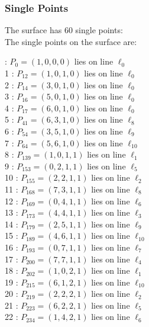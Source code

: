 \documentclass{article}
\begin{document}
{\subsubsection*{Single Points}
The surface has 60 single points:\\
The single points on the surface are:\\
\begin{multicols}{2}
 : $P_{0}=( 1, 0, 0, 0 )$ lies on line $\ell_{0}$\\
1 : $P_{12}=( 1, 0, 1, 0 )$ lies on line $\ell_{0}$\\
2 : $P_{14}=( 3, 0, 1, 0 )$ lies on line $\ell_{0}$\\
3 : $P_{16}=( 5, 0, 1, 0 )$ lies on line $\ell_{0}$\\
4 : $P_{17}=( 6, 0, 1, 0 )$ lies on line $\ell_{0}$\\
5 : $P_{41}=( 6, 3, 1, 0 )$ lies on line $\ell_{8}$\\
6 : $P_{54}=( 3, 5, 1, 0 )$ lies on line $\ell_{9}$\\
7 : $P_{64}=( 5, 6, 1, 0 )$ lies on line $\ell_{10}$\\
8 : $P_{139}=( 1, 0, 1, 1 )$ lies on line $\ell_{1}$\\
9 : $P_{153}=( 0, 2, 1, 1 )$ lies on line $\ell_{5}$\\
10 : $P_{155}=( 2, 2, 1, 1 )$ lies on line $\ell_{2}$\\
11 : $P_{168}=( 7, 3, 1, 1 )$ lies on line $\ell_{8}$\\
12 : $P_{169}=( 0, 4, 1, 1 )$ lies on line $\ell_{6}$\\
13 : $P_{173}=( 4, 4, 1, 1 )$ lies on line $\ell_{3}$\\
14 : $P_{179}=( 2, 5, 1, 1 )$ lies on line $\ell_{9}$\\
15 : $P_{189}=( 4, 6, 1, 1 )$ lies on line $\ell_{10}$\\
16 : $P_{193}=( 0, 7, 1, 1 )$ lies on line $\ell_{7}$\\
17 : $P_{200}=( 7, 7, 1, 1 )$ lies on line $\ell_{4}$\\
18 : $P_{202}=( 1, 0, 2, 1 )$ lies on line $\ell_{1}$\\
19 : $P_{215}=( 6, 1, 2, 1 )$ lies on line $\ell_{10}$\\
20 : $P_{219}=( 2, 2, 2, 1 )$ lies on line $\ell_{2}$\\
21 : $P_{223}=( 6, 2, 2, 1 )$ lies on line $\ell_{5}$\\
22 : $P_{234}=( 1, 4, 2, 1 )$ lies on line $\ell_{6}$\\

\end{multicols}}
\end{document}
